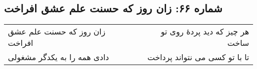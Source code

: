 \begin{center}
\section*{شماره ۶۶: زان روز که حسنت علم عشق افراخت}
\label{sec:066}
\begin{longtable}{l p{0.5cm} r}
زان روز که حسنت علم عشق افراخت
&&
هر چیز که دید پردهٔ روی تو ساخت
\\
دادی همه را به یکدگر مشغولی
&&
تا با تو کسی می نتواند پرداخت
\\
\end{longtable}
\end{center}

